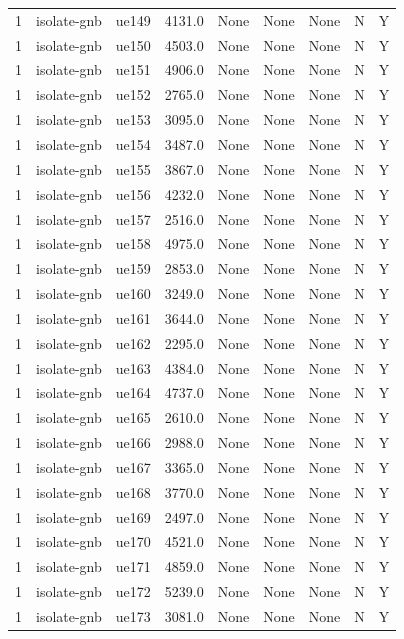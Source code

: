 \begin{table}[ht]
\begin{tabular}{|c|c|c|c|c|c|c|c|c|}
1 & isolate-gnb & ue149 & 4131.0 & None & None & None & N & Y \\
1 & isolate-gnb & ue150 & 4503.0 & None & None & None & N & Y \\
1 & isolate-gnb & ue151 & 4906.0 & None & None & None & N & Y \\
1 & isolate-gnb & ue152 & 2765.0 & None & None & None & N & Y \\
1 & isolate-gnb & ue153 & 3095.0 & None & None & None & N & Y \\
1 & isolate-gnb & ue154 & 3487.0 & None & None & None & N & Y \\
1 & isolate-gnb & ue155 & 3867.0 & None & None & None & N & Y \\
1 & isolate-gnb & ue156 & 4232.0 & None & None & None & N & Y \\
1 & isolate-gnb & ue157 & 2516.0 & None & None & None & N & Y \\
1 & isolate-gnb & ue158 & 4975.0 & None & None & None & N & Y \\
1 & isolate-gnb & ue159 & 2853.0 & None & None & None & N & Y \\
1 & isolate-gnb & ue160 & 3249.0 & None & None & None & N & Y \\
1 & isolate-gnb & ue161 & 3644.0 & None & None & None & N & Y \\
1 & isolate-gnb & ue162 & 2295.0 & None & None & None & N & Y \\
1 & isolate-gnb & ue163 & 4384.0 & None & None & None & N & Y \\
1 & isolate-gnb & ue164 & 4737.0 & None & None & None & N & Y \\
1 & isolate-gnb & ue165 & 2610.0 & None & None & None & N & Y \\
1 & isolate-gnb & ue166 & 2988.0 & None & None & None & N & Y \\
1 & isolate-gnb & ue167 & 3365.0 & None & None & None & N & Y \\
1 & isolate-gnb & ue168 & 3770.0 & None & None & None & N & Y \\
1 & isolate-gnb & ue169 & 2497.0 & None & None & None & N & Y \\
1 & isolate-gnb & ue170 & 4521.0 & None & None & None & N & Y \\
1 & isolate-gnb & ue171 & 4859.0 & None & None & None & N & Y \\
1 & isolate-gnb & ue172 & 5239.0 & None & None & None & N & Y \\
1 & isolate-gnb & ue173 & 3081.0 & None & None & None & N & Y \\

\end{tabular}
\end{table}
